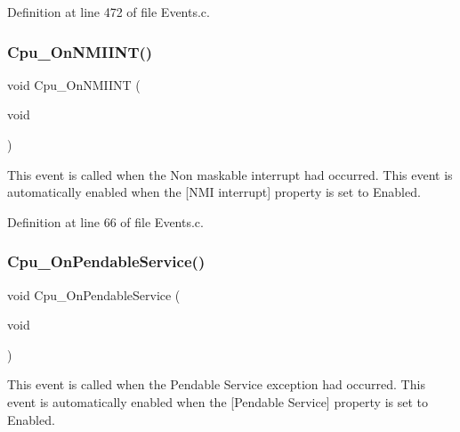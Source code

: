 Definition at line 472 of file Events.\+c.

\mbox{\label{group___events__module_ga960d094664356278ac5472d45a6ea2f3}} 
\subsubsection{\texorpdfstring{Cpu\+\_\+\+On\+N\+M\+I\+I\+N\+T()}{Cpu\_OnNMIINT()}}
{\footnotesize\ttfamily void Cpu\+\_\+\+On\+N\+M\+I\+I\+NT (\begin{DoxyParamCaption}\item[{void}]{ }\end{DoxyParamCaption})}



This event is called when the Non maskable interrupt had occurred. This event is automatically enabled when the \mbox{[}N\+MI interrupt\mbox{]} property is set to \textquotesingle{}Enabled\textquotesingle{}. 



Definition at line 66 of file Events.\+c.

\mbox{\label{group___events__module_ga8ae22afd184f10ce1e5d0870ef5d602e}} 
\subsubsection{\texorpdfstring{Cpu\+\_\+\+On\+Pendable\+Service()}{Cpu\_OnPendableService()}}
{\footnotesize\ttfamily void Cpu\+\_\+\+On\+Pendable\+Service (\begin{DoxyParamCaption}\item[{void}]{ }\end{DoxyParamCaption})}



This event is called when the Pendable Service exception had occurred. This event is automatically enabled when the \mbox{[}Pendable Service\mbox{]} property is set to \textquotesingle{}Enabled\textquotesingle{}. 



